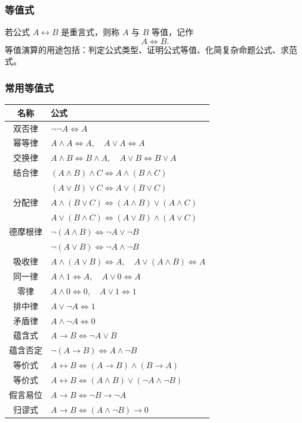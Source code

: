\subsubsection{等值式}

若公式 \(A\leftrightarrow B\) 是重言式，则称 \(A\) 与 \(B\) 等值，记作
\[
A\Leftrightarrow B.
\]
等值演算的用途包括：判定公式类型、证明公式等值、化简复杂命题公式、求范式。

\subsubsection{常用等值式}

\begin{center}
	\begin{tabular}{cl}
		\toprule
		名称 & 公式\\
		\midrule
		双否律 & \(\neg\neg A\Leftrightarrow A\)\\
		幂等律 & \(A\land A\Leftrightarrow A,\quad A\lor A\Leftrightarrow A\)\\
		交换律 & \(A\land B\Leftrightarrow B\land A,\quad A\lor B\Leftrightarrow B\lor A\)\\
		结合律 & \((A\land B)\land C\Leftrightarrow A\land(B\land C)\)\\
		       & \((A\lor B)\lor C\Leftrightarrow A\lor(B\lor C)\)\\
		分配律 & \(A\land(B\lor C)\Leftrightarrow(A\land B)\lor(A\land C)\)\\
		       & \(A\lor(B\land C)\Leftrightarrow(A\lor B)\land(A\lor C)\)\\
		德摩根律 & \(\neg(A\land B)\Leftrightarrow\neg A\lor\neg B\)\\
		          & \(\neg(A\lor B)\Leftrightarrow\neg A\land\neg B\)\\
		吸收律 & \(A\land(A\lor B)\Leftrightarrow A,\quad A\lor(A\land B)\Leftrightarrow A\)\\
		同一律 & \(A\land 1\Leftrightarrow A,\quad A\lor 0\Leftrightarrow A\)\\
		零律 & \(A\land 0\Leftrightarrow0,\quad A\lor1\Leftrightarrow1\)\\
		排中律 & \(A\lor\neg A\Leftrightarrow1\)\\
		矛盾律 & \(A\land\neg A\Leftrightarrow0\)\\
		蕴含式 & \(A\to B\Leftrightarrow\neg A\lor B\)\\
		蕴含否定 & \(\neg(A\to B)\Leftrightarrow A\land\neg B\)\\
		等价式 & \(A\leftrightarrow B\Leftrightarrow(A\to B)\land(B\to A)\)\\
		等价式 & \(A\leftrightarrow B\Leftrightarrow(A\land B)\lor(\neg A\land\neg B)\)\\
		假言易位 & \(A\to B\Leftrightarrow\neg B\to\neg A\)\\
		归谬式 & \(A\to B\Leftrightarrow(A\land\neg B)\to0\)\\
		\bottomrule
	\end{tabular}
\end{center}

